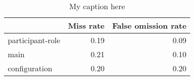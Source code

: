 \begin{table}[!ht]
\centering
\begin{tabular}{lrr}
\toprule
{} &  Miss rate &  False omission rate \\
\midrule
participant-role &       0.19 &                 0.09 \\
main             &       0.21 &                 0.10 \\
configuration    &       0.20 &                 0.20 \\
\bottomrule
\end{tabular}
\caption{My caption here}
\label{tab:unit-elements-oe-exact-errors}
\end{table}